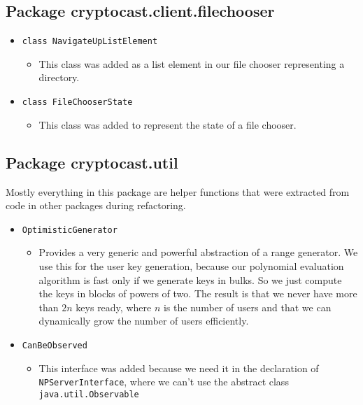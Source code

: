\documentclass[a4paper,10pt]{scrartcl}
\begin{document}
\subsection{Package cryptocast.client.filechooser}

\begin{itemize}

 \item \lstinline|class NavigateUpListElement|
  \begin{itemize}
   \item This class was added as a list element in our file chooser representing a directory.
  \end{itemize}

    \item \lstinline|class FileChooserState|
  \begin{itemize}
   \item This class was added to represent the state of a file chooser.
  \end{itemize}

\end{itemize}

\subsection{Package cryptocast.util}

Mostly everything in this package are helper functions that were extracted from code
in other packages during refactoring.

\begin{itemize}
  \item \lstinline|OptimisticGenerator|
  \begin{itemize}
   \item Provides a very generic and powerful abstraction of a range generator. We use this
	 for the user key generation, because our polynomial evaluation algorithm is fast only
	 if we generate keys in bulks. So we just compute the keys in blocks of powers of two.
	 The result is that we never have more than $2n$ keys ready, where $n$ is the number of users
	 and that we can dynamically grow the number of users efficiently.
  \end{itemize}

  \item \lstinline|CanBeObserved|
  \begin{itemize}
   \item This interface was added because we need it in the declaration of \lstinline|NPServerInterface|,
	 where we can't use the abstract class \lstinline|java.util.Observable|
  \end{itemize}

  \end{itemize}
\end{document}
